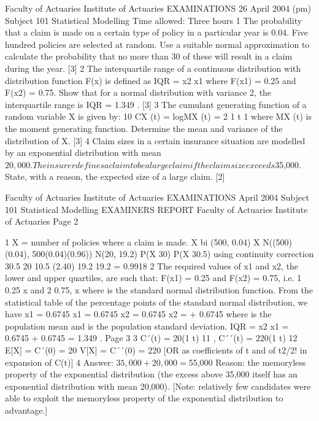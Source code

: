 Faculty of Actuaries Institute of Actuaries
EXAMINATIONS
26 April 2004 (pm)
Subject 101 Statistical Modelling
Time allowed: Three hours
1 The probability that a claim is made on a certain type of policy in a particular year is
0.04. Five hundred policies are selected at random.
Use a suitable normal approximation to calculate the probability that no more than 30
of these will result in a claim during the year. [3]
2 The interquartile range of a continuous distribution with distribution function F(x) is
defined as IQR = x2 x1 where F(x1) = 0.25 and F(x2) = 0.75.
Show that for a normal distribution with variance 2, the interquartile range is
IQR = 1.349 . [3]
3 The cumulant generating function of a random variable X is given by:
10 CX (t) = logMX (t) = 2 1 t 1
where MX (t) is the moment generating function.
Determine the mean and variance of the distribution of X. [3]
4 Claim sizes in a certain insurance situation are modelled by an exponential
distribution with mean $20,000. The insurer defines a claim to be a large claim if the
claim size exceeds $35,000.
State, with a reason, the expected size of a large claim. [2]

Faculty of Actuaries Institute of Actuaries
EXAMINATIONS
April 2004
Subject 101 Statistical Modelling
EXAMINERS REPORT
Faculty of Actuaries
Institute of Actuaries
Page 2

1 X = number of policies where a claim is made.
X bi (500, 0.04)
X N((500)(0.04), 500(0.04)(0.96)) N(20, 19.2)
P(X 30) P(X 30.5) using continuity correction
30.5 20 10.5
(2.40)
19.2 19.2
= 0.9918
2 The required values of x1 and x2, the lower and upper quartiles, are such that:
F(x1) = 0.25 and F(x2) = 0.75,
i.e. 1 0.25
x
and 2 0.75,
x
where is the standard normal distribution function.
From the statistical table of the percentage points of the standard normal distribution,
we have
x1
= 0.6745 x1 = 0.6745
x2
= 0.6745 x2 = + 0.6745
where is the population mean and is the population standard deviation.
IQR = x2 x1
= 0.6745 + 0.6745
= 1.349 .
Page 3
3 C´(t) = 20(1 t) 11 , C´´(t) = 220(1 t) 12
E[X] = C´(0) = 20
V[X] = C´´(0) = 220
[OR as coefficients of t and of t2/2! in expansion of C(t)]
4 Answer: $35,000 + 20,000 = $55,000
Reason: the memoryless property of the exponential distribution (the excess above
35,000 itself has an exponential distribution with mean 20,000).
[Note: relatively few candidates were able to exploit the memoryless property of the
exponential distribution to advantage.]
